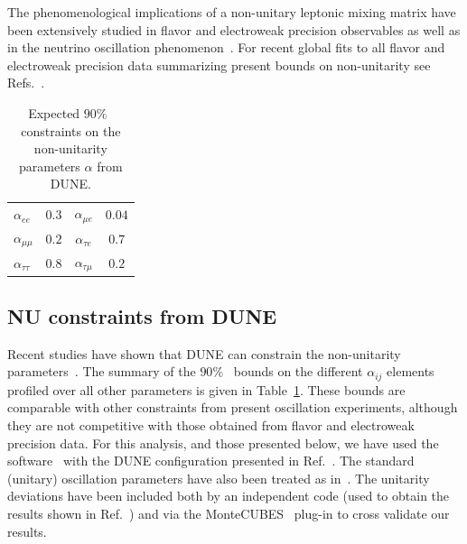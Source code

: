The phenomenological implications of a non-unitary leptonic mixing matrix have been extensively studied in flavor and electroweak precision observables as well as in the neutrino oscillation phenomenon~\cite{Shrock:1980vy,Schechter:1980gr,Shrock:1980ct,Shrock:1981wq,Langacker:1988ur,Bilenky:1992wv,Nardi:1994iv,Tommasini:1995ii,Antusch:2006vwa,FernandezMartinez:2007ms,Antusch:2008tz,Biggio:2008in,Antusch:2009pm,Forero:2011pc,Alonso:2012ji,Antusch:2014woa,Abada:2015trh,Fernandez-Martinez:2015hxa,Escrihuela:2015wra,Parke:2015goa,Miranda:2016wdr,Fong:2016yyh,Escrihuela:2016ube}. For recent global fits to all flavor and electroweak precision data summarizing present bounds on non-unitarity see Refs.~\cite{Antusch:2014woa,Fernandez-Martinez:2016lgt}. 

\begin{table}[htb]
\caption[Expected $90 \%$~ constraints on the non-unitarity parameters $\alpha$]{\label{tab:bounds} Expected $90 \%$~  constraints on the non-unitarity parameters $\alpha$ from DUNE. }
\begin{center}
\renewcommand{\arraystretch}{1.6}
\begin{tabular}{  l@{\quad\quad}  c@{\quad\quad}   c@{\quad\quad}   c@{\quad\quad}      }
\hline
$\alpha_{ee}$ & $0.3$ & $\alpha_{\mu e}$ & $0.04$  \\
$\alpha_{\mu\mu}$ & $0.2$ & $\alpha_{\tau e}$ & $0.7$ \\
$\alpha_{\tau\tau}$ & $0.8$ & $\alpha_{\tau\mu}$ & $0.2$  \\ \hline
\end{tabular}
\end{center}
\end{table}

\subsection{NU constraints from DUNE}
Recent studies have shown that DUNE can constrain the non-unitarity parameters~\cite{Blennow:2016jkn, Escrihuela:2016ube}. The summary of the $90 \%$~  bounds on the different $\alpha_{ij}$ elements profiled over all other parameters is given in Table~\ref{tab:bounds}. 
These bounds are comparable with other constraints from present oscillation experiments, although they are not competitive with those obtained from flavor and electroweak precision data.
For this analysis, and %
those presented below, we have used the   software~\cite{Huber:2004ka,Huber:2007ji} with the DUNE  configuration presented in Ref.~\cite{Alion:2016uaj}. The standard (unitary) oscillation parameters have also been treated as in~\cite{Alion:2016uaj}. The unitarity deviations have been included both by an independent code (used to obtain the results shown in Ref.~\cite{Escrihuela:2016ube}) and via the MonteCUBES~\cite{Blennow:2009pk} plug-in to cross validate our results.

